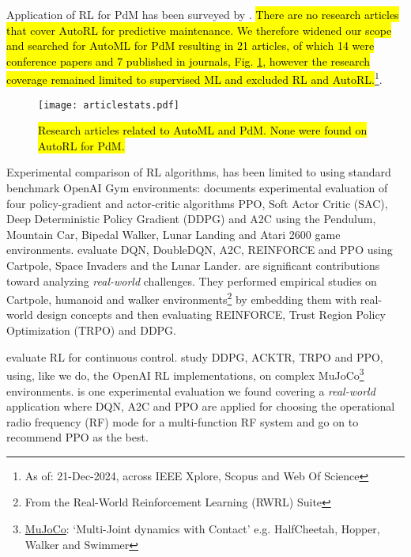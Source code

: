 \documentclass[referee, sn-mathphys-num]{sn-jnl}
\newcommand{\hlc}[2][cyan!15]{{\colorlet{foo}{#1}\sethlcolor{foo}\hl{#2}}}
\begin{document}
	Application of RL for PdM has been surveyed by \cite{Panzer2021, Erhan2021, siraskar2023}. \hlc{There are no research articles that cover AutoRL for predictive maintenance. We therefore widened our scope and searched for AutoML for PdM resulting in 21 articles, of which 14 were conference papers and 7 published in journals, Fig. {\ref{fig_artcilestats}}, however the research coverage remained limited to supervised ML and excluded RL and AutoRL.}\footnote{As of: 21-Dec-2024, across IEEE Xplore\texttrademark{}, Scopus\texttrademark{} and Web Of Science\texttrademark{}}.
	\begin{figure}[hbt!]
		\centering
		\texttt{[image: articlestats.pdf]}
		\caption{\hlc{Research articles related to AutoML and PdM. None were found on AutoRL for PdM.}}
		\label{fig_artcilestats}
	\end{figure} 
	
	Experimental comparison of RL algorithms, has been limited to using standard benchmark OpenAI Gym environments: \cite{sandeep2022experimental} documents experimental evaluation of four policy-gradient and actor-critic algorithms PPO, Soft Actor Critic (SAC), Deep Deterministic Policy Gradient (DDPG) and A2C using the Pendulum, Mountain Car, Bipedal Walker, Lunar Landing and Atari 2600 game environments. \cite{Krishna2020} evaluate DQN, DoubleDQN, A2C, REINFORCE and PPO using Cartpole, Space Invaders and the Lunar Lander. \cite{dulac2021, dulac2020empirical} are significant contributions toward analyzing \textit{real-world} challenges. They performed empirical studies on Cartpole, humanoid and walker environments\footnote{From the Real-World Reinforcement Learning (RWRL) Suite} by embedding them with real-world design concepts and then evaluating REINFORCE, Trust Region Policy Optimization (TRPO) and DDPG.
	
	\cite{dulac2021, henderson2018deep} evaluate RL for continuous control. \cite{henderson2018deep} study DDPG, ACKTR, TRPO and PPO, using, like we do, the OpenAI RL implementations, on complex MuJoCo\footnote{\href{https://mujoco.org/}{MuJoCo}: `Multi-Joint dynamics with Contact' e.g. HalfCheetah, Hopper, Walker and Swimmer} environments. \cite{ford2022cognitive} is one experimental evaluation we found covering a \textit{real-world} application where DQN, A2C and PPO are applied for choosing the operational radio frequency (RF) mode for a multi-function RF system and go on to recommend PPO as the best.
	
\end{document}
